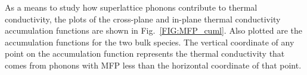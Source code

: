 \documentclass[aps,prb,preprint,preprintnumbers,amsmath,amssymb,floatfix,superscriptaddress]{revtex4}
\newcommand{\kv}{\mspace{-4.0mu}\left(\mspace{-8.0mu}
\begin{smallmatrix}&\pmb{\kappa} \\&\nu\end{smallmatrix}
\mspace{-3.0mu}\right)}
\begin{document}
As a means to study how superlattice phonons contribute to thermal conductivity, the plots of the cross-plane and in-plane thermal conductivity accumulation functions are shown in Fig.~\ref{FIG:MFP_cuml}. Also plotted are the accumulation functions for the two bulk species. The vertical coordinate of any point on the accumulation function represents the thermal conductivity that comes from phonons with MFP less than the horizontal coordinate of that point.

\begin{comment}
The plots of the CP thermal conductivity MFP contribution curves, defined by
\begin{equation}\label{EQ:MFP_contr}
\begin{split}
dk_{\alpha}(\Lambda \kv)=c_{ph}\kv v^2_{g,\alpha}\kv \frac{\Lambda \kv} {|\pmb{\mathrm{v}}_{g}\kv|} d\Lambda \kv, 
\end{split}
\end{equation}
is shown in Fig.~\ref{FIG:MFP_cp}. 
\begin{figure}%
\begin{center}
\scalebox{1}{ \texttt{[image: MFP\_cp.eps]}}
\renewcommand{\figure}{Fig.}
\caption{Phonon mean free path normalized by the period length contribution to the cross-plane thermal conductivity. Color corresponds to those used in Fig.~\ref{FIG:lifetime}. Average MFP is reported. Orange corresponds to lighter bulk and green corresponds to heavier bulk.}
\label{FIG:MFP_cp}
\end{center}
\end{figure}
There is a clear reduction in the contribution to cross-plane thermal conductivity in perfect superlattices from modes with a MFP greater than the period length as period length increases. This trend is consistent with the theoretical predictions from Mahan that a minimum thermal conductivity occurs as the transport behaviour shifts from a wave-regime to particle-regime when the average MFP transitions from being greater than the period length to being less than the period length.\cite{PhysRevLett.84.927,PhysRevB.56.10754} This same trend is observed in the contribution curves for the in-plane conductivity (not shown). The minimum cross-plane thermal conductivity for perfect superlattices occurs at a point where the average MFP is greater than the period length ($4 \times 4$), as described by Mahan.\cite{PhysRevLett.84.927} 
\end{comment}
\end{document}

